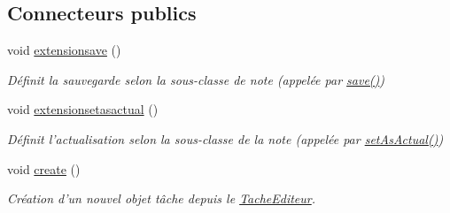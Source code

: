 \subsection*{Connecteurs publics}
\begin{DoxyCompactItemize}
\item 
\hypertarget{class_tache_editeur_acfa771785cdea091ca5c03288c79c51a}{void \hyperlink{class_tache_editeur_acfa771785cdea091ca5c03288c79c51a}{extensionsave} ()}\label{class_tache_editeur_acfa771785cdea091ca5c03288c79c51a}

\begin{DoxyCompactList}\small\item\em Définit la sauvegarde selon la sous-\/classe de note (appelée par \hyperlink{class_note_editeur_a605b1bca885c25460cb7d8863d1f3d03}{save()}) \end{DoxyCompactList}\item 
\hypertarget{class_tache_editeur_aed4f893926b463e92086aa8553bd5d82}{void \hyperlink{class_tache_editeur_aed4f893926b463e92086aa8553bd5d82}{extensionsetasactual} ()}\label{class_tache_editeur_aed4f893926b463e92086aa8553bd5d82}

\begin{DoxyCompactList}\small\item\em Définit l'actualisation selon la sous-\/classe de la note (appelée par \hyperlink{class_note_editeur_a857f285628a0b7dcb6a69b18c977aa71}{set\-As\-Actual()}) \end{DoxyCompactList}\item 
\hypertarget{class_tache_editeur_a22a45dfa8b15b5b57076b01bf1a73640}{void \hyperlink{class_tache_editeur_a22a45dfa8b15b5b57076b01bf1a73640}{create} ()}\label{class_tache_editeur_a22a45dfa8b15b5b57076b01bf1a73640}

\begin{DoxyCompactList}\small\item\em Création d'un nouvel objet tâche depuis le \hyperlink{class_tache_editeur}{Tache\-Editeur}. \end{DoxyCompactList}\end{DoxyCompactItemize}
